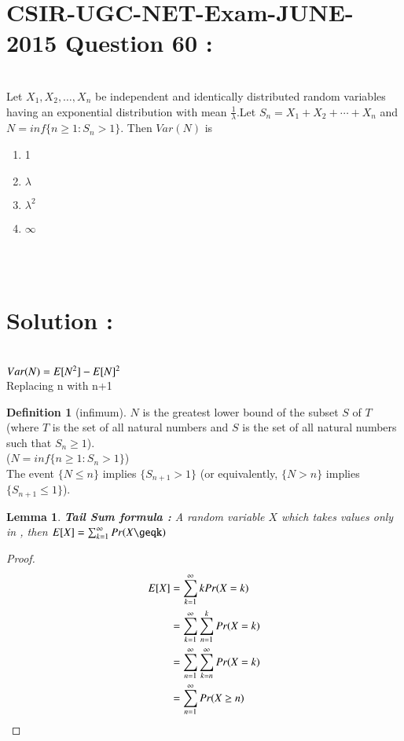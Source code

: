 \documentclass[journal,12pt,twocolumn]{IEEEtran}
\newtheorem{lemma}[theorem]{Lemma}
\theoremstyle{definition}
\newtheorem{definition}{Definition}[section]
\begin{document}
\section{CSIR-UGC-NET-Exam-JUNE-2015 Question 60 :}\\
Let $X_1, X_2, \dots, X_n$ be independent and identically distributed random variables having an exponential distribution with mean $\frac{1}{\lambda}$.Let $S_n = X_1 + X_2 + \cdots + X_n$ and $N = inf \{n \geq 1: S_n > 1\}$. Then $Var(N)$ is\\
\begin{enumerate}
    \item 1
    \item $\lambda$
    \item $\lambda^2$
    \item $\infty$
\end{enumerate}
\\ \\
\section{Solution :}\\
$Var(N) = E[ N^2 ] - E[ N ]^2$\\
Replacing n with n+1\\
\begin{definition}[infimum]
$N$ is the greatest lower bound of the subset $S$ of $T$ (where $T$ is the set of all natural numbers and $S$ is the set of all natural numbers such that $S_n \geq 1$).\\
($N = inf \{n \geq 1: S_n > 1\}$)\\
The event $\{N \leq n\}$ implies $\{S_{n+1} > 1\}$ (or equivalently, $\{N > n\}$ implies $\{S_{n+1} \leq 1\}$).\\
\end{definition}

\begin{lemma}
\textbf{Tail Sum formula : } A random variable $X$ which takes values only in , then $\mean{X} = \sum _{k=1} ^\infty Pr(X\geqk)$\\
\end{lemma}
\begin{proof}
\begin{align}
    E[ X ] &= \sum _{k = 1} ^\infty k Pr(X=k)\\
    &= \sum _{k = 1} ^\infty \sum _{n=1} ^k Pr(X=k)\\
    &= \sum _{n = 1} ^\infty \sum _{k = n} ^\infty Pr(X=k)\\
    &= \sum _{n = 1} ^\infty Pr(X\geq n)
\end{align}
\end{proof}
\end{document}
